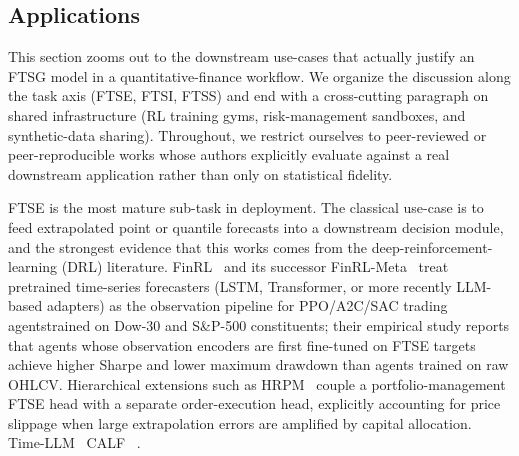 \subsection{Applications}
\label{sec:applications}

This section zooms out to the downstream use-cases that actually justify an FTSG
model in a quantitative-finance workflow. We organize the discussion
along the task axis (FTSE, FTSI, FTSS) and end with a cross-cutting
paragraph on shared infrastructure (RL training gyms, risk-management
sandboxes, and synthetic-data sharing). Throughout, we restrict
ourselves to peer-reviewed or peer-reproducible works whose authors
explicitly evaluate against a real downstream application rather than
only on statistical fidelity.


FTSE is the most mature sub-task in deployment. The classical use-case
is to feed extrapolated point or quantile forecasts into a downstream
decision module, and the strongest evidence that this works comes from
the deep-reinforcement-learning (DRL) literature.
FinRL~\citep{liu2020finrl} and its successor
FinRL-Meta~\citep{liu2022finrlmeta} treat pretrained time-series
forecasters (LSTM, Transformer, or more recently LLM-based adapters) as
the observation pipeline for PPO/A2C/SAC trading agentstrained on
Dow-30 and S\&P-500 constituents; their empirical study reports that
agents whose observation encoders are first fine-tuned on FTSE targets
achieve higher Sharpe and lower maximum drawdown than agents trained on
raw OHLCV. Hierarchical extensions such as
HRPM~\citep{wang2020hrpm} couple a portfolio-management FTSE head with
a separate order-execution head, explicitly accounting for price
slippage when large extrapolation errors are amplified by capital
allocation. Time-LLM~\citep{jin2024timellm} \revdeldec{ , }CALF~\citep{liu2025calf} .

